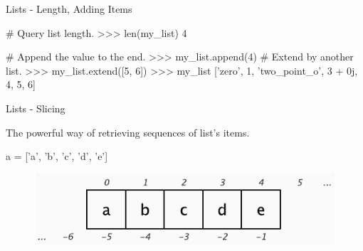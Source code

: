\documentclass[10pt]{beamer}
\begin{document}
\begin{frame}[fragile]{Lists - Length, Adding Items}
	\begin{pythoncode}
		# Query list length.
		>>> len(my_list)
		4
	\end{pythoncode}

	\pause
	\begin{pythoncode}
		# Append the value to the end.
		>>> my_list.append(4)
		# Extend by another list.
		>>> my_list.extend([5, 6])
		>>> my_list
		['zero', 1, 'two_point_o', 3 + 0j, 4, 5, 6]
	\end{pythoncode}
\end{frame}

\begin{frame}[fragile]{Lists - Slicing}

	The powerful way of retrieving sequences of list's items.

	\pause
	\begin{pythoncode}
		a = ['a', 'b', 'c', 'd', 'e']
	\end{pythoncode}

	\pause
	\begin{figure}[!h]
		\centering
		\includegraphics[width=0.6\linewidth]{img/slicing.pdf}
	\end{figure}
\end{frame}
\end{document}
